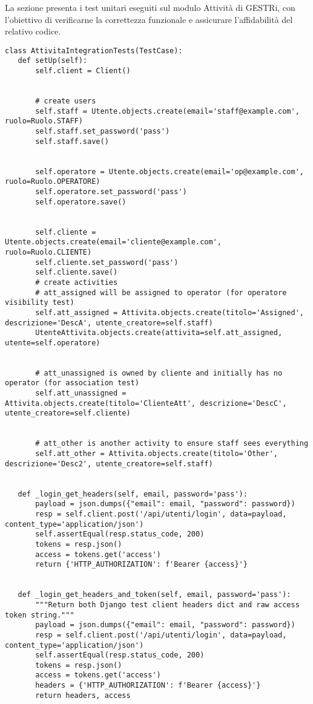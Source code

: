 \documentclass[a4paper]{report}
\begin{document}
La sezione presenta i test unitari eseguiti sul modulo Attività di GESTRi, con l’obiettivo di verificarne la correttezza funzionale e assicurare l’affidabilità del relativo codice.
\begin{scriptsize}
\estiloPython
\begin{lstlisting}[caption={Attivita}, label=lst:javacode]
class AttivitaIntegrationTests(TestCase):
   def setUp(self):
       self.client = Client()


       # create users
       self.staff = Utente.objects.create(email='staff@example.com', ruolo=Ruolo.STAFF)
       self.staff.set_password('pass')
       self.staff.save()


       self.operatore = Utente.objects.create(email='op@example.com', ruolo=Ruolo.OPERATORE)
       self.operatore.set_password('pass')
       self.operatore.save()


       self.cliente = Utente.objects.create(email='cliente@example.com', ruolo=Ruolo.CLIENTE)
       self.cliente.set_password('pass')
       self.cliente.save()
       # create activities
       # att_assigned will be assigned to operator (for operatore visibility test)
       self.att_assigned = Attivita.objects.create(titolo='Assigned', descrizione='DescA', utente_creatore=self.staff)
       UtenteAttivita.objects.create(attivita=self.att_assigned, utente=self.operatore)


       # att_unassigned is owned by cliente and initially has no operator (for association test)
       self.att_unassigned = Attivita.objects.create(titolo='ClienteAtt', descrizione='DescC', utente_creatore=self.cliente)


       # att_other is another activity to ensure staff sees everything
       self.att_other = Attivita.objects.create(titolo='Other', descrizione='Desc2', utente_creatore=self.staff)


   def _login_get_headers(self, email, password='pass'):
       payload = json.dumps({"email": email, "password": password})
       resp = self.client.post('/api/utenti/login', data=payload, content_type='application/json')
       self.assertEqual(resp.status_code, 200)
       tokens = resp.json()
       access = tokens.get('access')
       return {'HTTP_AUTHORIZATION': f'Bearer {access}'}


   def _login_get_headers_and_token(self, email, password='pass'):
       """Return both Django test client headers dict and raw access token string."""
       payload = json.dumps({"email": email, "password": password})
       resp = self.client.post('/api/utenti/login', data=payload, content_type='application/json')
       self.assertEqual(resp.status_code, 200)
       tokens = resp.json()
       access = tokens.get('access')
       headers = {'HTTP_AUTHORIZATION': f'Bearer {access}'}
       return headers, access



\end{lstlisting}
\end{scriptsize}
\end{document}
